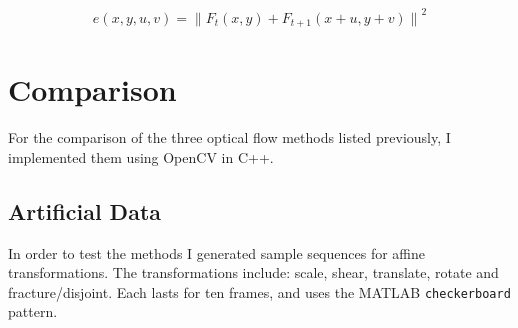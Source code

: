\documentclass[a4paper,10pt]{article}
\begin{document}
      \begin{align*}
        e(x,y,u,v) = {\lVert F_t(x,y)+F_{t+1}(x+u,y+v)\rVert}^2 
      \end{align*}
      
  \section{Comparison}
    For the comparison of the three optical flow methods listed previously, I implemented them using OpenCV in C++.
    
    \subsection{Artificial Data}
    
      In order to test the methods I generated sample sequences for affine transformations. The transformations include: scale, shear, translate, rotate and fracture/disjoint. Each lasts for ten frames, and uses the MATLAB \verb|checkerboard| pattern.
      
\end{document}
